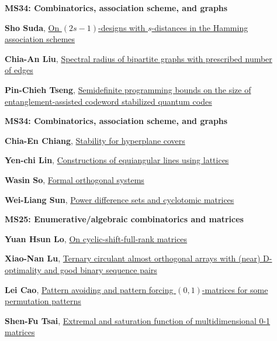 \documentclass[ILAS2025-program.tex]{subfiles}
\begin{document}
        \begin{description}
    \item[] {\color{mstitle}\textbf{MS34: Combinatorics, association scheme, and graphs}} 
    \item[] \hypertarget{up0286}{}\textbf{Sho Suda}, \hyperlink{down0286}{On $(2s-1)$-designs with $s$-distances in the Hamming association schemes
}
        \item[] \hypertarget{up0287}{}\textbf{Chia-An Liu}, \hyperlink{down0287}{Spectral radius of bipartite graphs with prescribed number of edges}
        \item[] \hypertarget{up0288}{}\textbf{Pin-Chieh Tseng}, \hyperlink{down0288}{Semidefinite programming bounds on the size of entanglement-assisted codeword stabilized quantum codes
}
        \end{description}
    \begin{description}
    \item[] {\color{mstitle}\textbf{MS34: Combinatorics, association scheme, and graphs}} 
    \item[] \hypertarget{up0323}{}\textbf{Chia-En Chiang}, \hyperlink{down0323}{Stability for hyperplane covers
}
        \item[] \hypertarget{up0324}{}\textbf{Yen-chi Lin}, \hyperlink{down0324}{Constructions of equiangular lines using lattices
}
        \item[] \hypertarget{up0325}{}\textbf{Wasin So}, \hyperlink{down0325}{Formal orthogonal systems}
        \item[] \hypertarget{up0326}{}\textbf{Wei-Liang Sun}, \hyperlink{down0326}{Power difference sets and cyclotomic matrices}
        \end{description}
    \begin{description}
    \item[] {\color{mstitle}\textbf{MS25: Enumerative/algebraic combinatorics and matrices}} 
    \item[] \hypertarget{up0367}{}\textbf{Yuan Hsun Lo}, \hyperlink{down0367}{On cyclic-shift-full-rank matrices
}
        \item[] \hypertarget{up0368}{}\textbf{Xiao-Nan Lu}, \hyperlink{down0368}{Ternary circulant almost orthogonal arrays with (near) D-optimality and good binary sequence pairs}
        \item[] \hypertarget{up0369}{}\textbf{Lei Cao}, \hyperlink{down0369}{Pattern avoiding and pattern forcing $(0,1)$-matrices for some permutation patterns
}
        \item[] \hypertarget{up0370}{}\textbf{Shen-Fu Tsai}, \hyperlink{down0370}{Extremal and saturation function of multidimensional 0-1 matrices
}
        \end{description}
    \newpage
\end{document}
